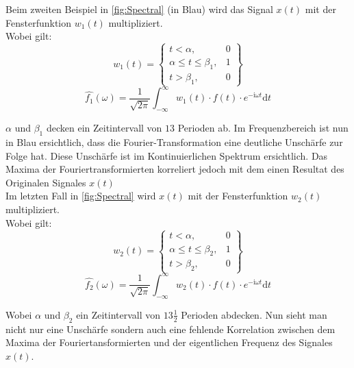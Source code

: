 Beim zweiten Beispiel in \ref{fig:Spectral} (in Blau) wird das Signal $x(t)$ mit der Fensterfunktion $w_{1}(t)$ multipliziert.\\
Wobei gilt: 
\begin{equation}
	w_{1}(t)= \left\{\begin{array}{lll}{t<\alpha,} & {0} \\ {\alpha\leq t \leq\beta_{1},} & {1}\\ {t>\beta_{1},}&{0}\end{array}\right\}
\end{equation}
\begin{equation}
	\hat{f_{1}}(\omega)=\frac{1}{\sqrt{2 \pi}} \int_{-\infty}^{\infty} w_{1}(t)\cdot f(t) \cdot e^{-\mathrm{i} \omega t} \mathrm{d} t
\end{equation}

$\alpha$ und $\beta_{1}$ decken ein Zeitintervall von $13$ Perioden ab. Im Frequenzbereich ist nun in Blau ersichtlich, dass die Fourier-Transformation eine deutliche Unschärfe zur Folge hat. Diese Unschärfe ist im Kontinuierlichen Spektrum ersichtlich. Das Maxima der Fouriertransformierten korreliert jedoch mit dem einen Resultat des Originalen Signales $x(t)$\\




Im letzten Fall in \ref{fig:Spectral} wird $x(t)$ mit der Fensterfunktion $w_{2}(t)$ multipliziert.\\
Wobei gilt: 
\begin{equation}
	w_{2}(t)= \left\{\begin{array}{lll}{t<\alpha,} & {0} \\ {\alpha\leq t \leq\beta_{2},} & {1}\\ {t>\beta_{2},}&{0}\end{array}\right\}
\end{equation}
\begin{equation}
	\hat{f_{2}}(\omega)=\frac{1}{\sqrt{2 \pi}} \int_{-\infty}^{\infty} w_{2}(t)\cdot f(t) \cdot e^{-\mathrm{i} \omega t} \mathrm{d} t
\end{equation}

Wobei $\alpha$ und $\beta_{2}$ ein Zeitintervall von $13\frac{1}{2}$ Perioden abdecken. Nun sieht man nicht nur eine Unschärfe sondern auch eine fehlende Korrelation zwischen dem Maxima der Fouriertansformierten und der eigentlichen Frequenz des Signales $x(t)$.\\

